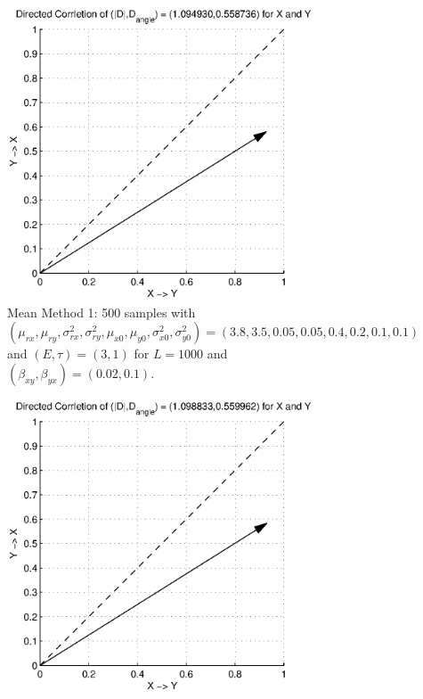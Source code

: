 \documentclass[a4paper,11pt]{article}
\begin{document}
\begin{figure}[h!t]
\centering
\begin{subfigure}[b]{0.4\textwidth}
\label{fig:SugEx1DCORR_mean1}
\includegraphics[scale=0.55]{graphics/SugEx1DCORR_mean1.eps}
\caption{Mean Method 1: 500 samples with $\left(\mu_{rx},\mu_{ry},\sigma^2_{rx},\sigma^2_{ry},\mu_{x0},\mu_{y0},\sigma^2_{x0},\sigma^2_{y0}\right) = \left(3.8,3.5,0.05,0.05,0.4,0.2,0.1,0.1\right)$ and $\left(E,\tau\right)=\left(3,1\right)$ for $L=1000$ and $(\beta_{xy},\beta_{yx})=(0.02,0.1)$.}
\end{subfigure}
\begin{subfigure}[b]{0.4\textwidth}
\label{fig:SugEx1DCORR_mean2}
\includegraphics[scale=0.55]{graphics/SugEx1DCORR_mean2.eps}

\end{subfigure}
\end{figure}
\end{document}
